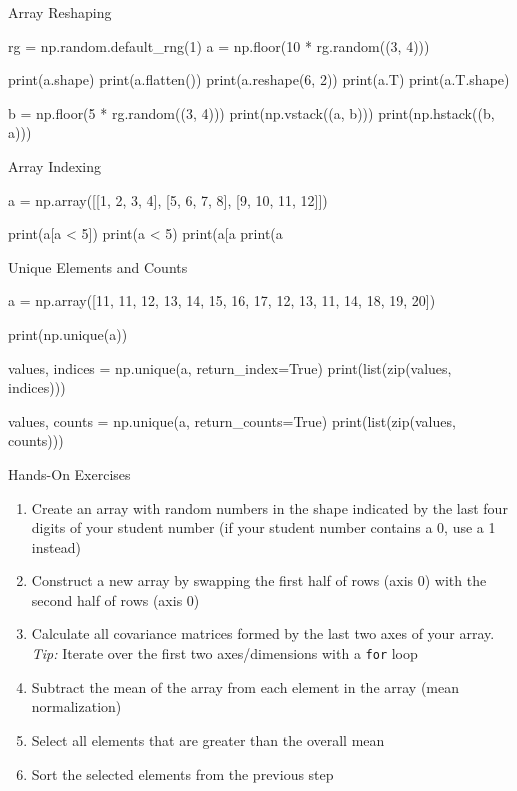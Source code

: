 \documentclass[ignorenonframetext,xcolor=x11names]{beamer}
\begin{document}
\begin{frame}[fragile]{Array Reshaping}
\footnotesize
\begin{pythoncode}
rg = np.random.default_rng(1)
a = np.floor(10 * rg.random((3, 4)))

print(a.shape)
print(a.flatten())
print(a.reshape(6, 2))
print(a.T)
print(a.T.shape)

b = np.floor(5 * rg.random((3, 4)))
print(np.vstack((a, b)))
print(np.hstack((b, a)))
\end{pythoncode}
\end{frame}

\begin{frame}[fragile]{Array Indexing}
\footnotesize
\begin{pythoncode}
a = np.array([[1, 2, 3, 4], 
              [5, 6, 7, 8], 
              [9, 10, 11, 12]])

print(a[a < 5])
print(a < 5)
print(a[a%
print(a%
\end{pythoncode}
\end{frame}              

\begin{frame}[fragile]{Unique Elements and Counts}
\footnotesize
\begin{pythoncode}
a = np.array([11, 11, 12, 13, 14, 15, 16, 
              17, 12, 13, 11, 14, 18, 19, 20])
             
print(np.unique(a))

values, indices = np.unique(a, return_index=True)
print(list(zip(values, indices)))

values, counts = np.unique(a, return_counts=True)
print(list(zip(values, counts)))
\end{pythoncode}
\end{frame}

\begin{frame}{Hands-On Exercises}
\begin{enumerate}
   \item Create an array with random numbers in the shape indicated by the last four digits of your student number (if your student number contains a 0, use a 1 instead)
   \item Construct a new array by swapping the first half of rows (axis 0) with the second half of rows (axis 0)
   \item Calculate all covariance matrices formed by the last two axes of your array. \emph{Tip:} Iterate over the first two axes/dimensions with a \texttt{for} loop
   \item Subtract the mean of the array from each element in the array (mean normalization)
   \item Select all elements that are greater than the overall mean
   \item Sort the selected elements from the previous step
\end{enumerate}
\end{frame}
\end{document}
